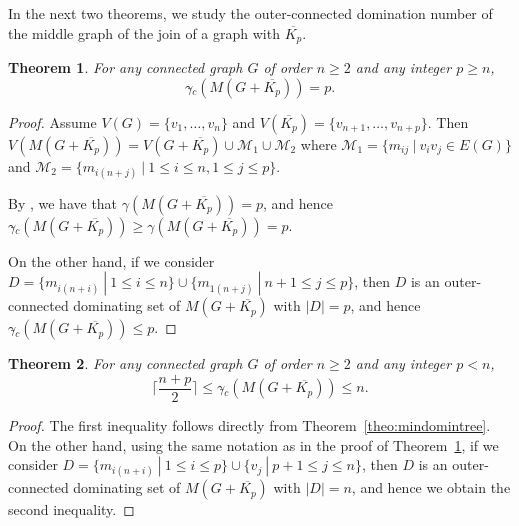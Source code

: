 \documentclass[a4paper,12pt, reqno]{amsart}
\newtheorem{Theorem}{Theorem}[section]
\newtheorem{Definition}[Theorem]{Definition}
\begin{document}

In the next two theorems, we study the outer-connected domination number of the middle graph of the join of a graph with $\overline{K_p}$. 
\begin{Theorem}\label{theomindominjoinpbig}
	For any connected graph $G$ of order $n\geq 2$ and any integer $p\geq n$, 
	 $$\gamma{\tilde{}} _{c}(M(G+\overline{K_p}))=p.$$
\end{Theorem}
\begin{proof}
	Assume $V(G)=\{v_1,\dots,v_n\}$ and $V(\overline{K_p})=\{v_{n+1},\dots,v_{n+p}\}$. Then $V(M(G+\overline{K_p}))=V(G+\overline{K_p})\cup  \mathcal{M}_1\cup  \mathcal{M}_2$ where $\mathcal{M}_1= \{m_{ij}~|~v_iv_j\in  E(G)\}$ and $\mathcal{M}_2= \{m_{i(n+j)}~|~1\leq i \leq n, 1\leq j \leq p\}$.  
	
	By  \cite[Theorem 2.15]{DSFBME}, we have that $\gamma(M(G+\overline{K_p}))= p$, and hence $\gamma{\tilde{}} _{c}(M(G+\overline{K_p})) \geq \gamma(M(G+\overline{K_p}))= p$.
	
	On the other hand, if we consider $D=\{m_{i(n+i)}~|~1\leq i \leq n\}\cup \{m_{1(n+j)}~|~n+1\leq j \leq p\}$, then $D$ is an outer-connected dominating set of $M(G+\overline{K_p})$ with $|D|=p$, and hence $\gamma{\tilde{}} _{c}(M(G+\overline{K_p})) \le p$.
\end{proof}

\begin{Theorem}\label{theo:mindominjoinpsmallineq}
	For any connected graph $G$ of order $n\geq 2$ and any integer $p<n$, 
	$$\lceil\frac{n+p}{2}\rceil\le\gamma{\tilde{}} _{c}(M(G+\overline{K_p}))\le n.$$
\end{Theorem}
\begin{proof} The first inequality follows directly from Theorem~\ref{theo:mindomintree}.
	On the other hand, using the same notation as in the proof of Theorem~\ref{theomindominjoinpbig}, if we consider $D=\{m_{i(n+i)}~|~1\le i\le p\}\cup\{v_j~|~p+1\le j\le n\}$, then $D$ is an outer-connected dominating set of $M(G+\overline{K_p})$ with $|D|=n$, and hence we obtain the second inequality.
\end{proof}
\end{document}
